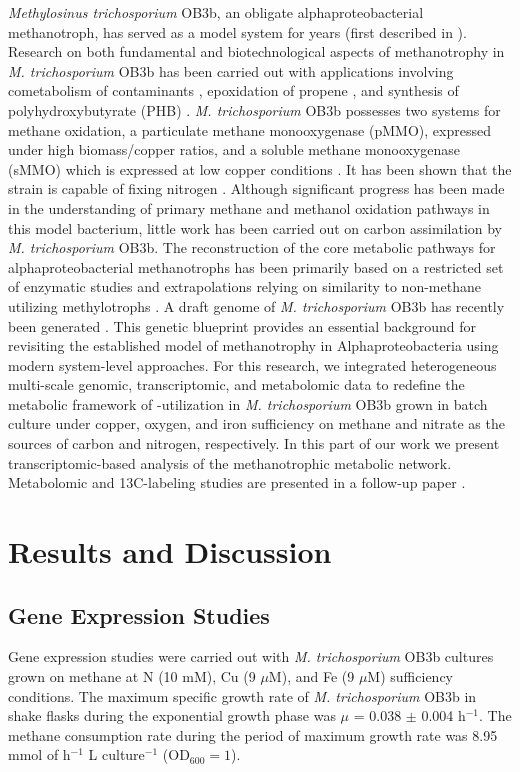 \textit{Methylosinus trichosporium} OB3b, an obligate alphaproteobacterial methanotroph, has served as a model system for years (first described in \cite{whittenbury1970}).
Research on both fundamental and biotechnological aspects of methanotrophy in \textit{M. trichosporium} OB3b has been carried out with applications involving cometabolism of contaminants \cite{oldenhuis1991, EPA1993, fitch1996}, epoxidation of propene \cite{hou1979}, and synthesis of polyhydroxybutyrate (PHB) \cite{williams1998, doronina2008}.
\textit{M. trichosporium} OB3b possesses two systems for methane oxidation, a particulate methane monooxygenase (pMMO), expressed under high biomass/copper ratios, and a soluble methane monooxygenase (sMMO) which is expressed at low copper conditions \cite{hakemian2007, semrau2010}.
It has been shown that the strain is capable of fixing nitrogen \cite{oakley1988, auman2001}.
Although significant progress has been made in the understanding of primary methane and methanol oxidation pathways in this model bacterium, little work has been carried out on carbon assimilation by \textit{M. trichosporium} OB3b.
The reconstruction of the core metabolic pathways for alphaproteobacterial methanotrophs has been primarily based on a restricted set of enzymatic studies and extrapolations relying on similarity to non-methane utilizing methylotrophs \cite{lawrence1970, strom1974}.
A draft genome of \textit{M. trichosporium} OB3b has recently been generated \cite{stein2010}.
This genetic blueprint provides an essential background for revisiting the established model of methanotrophy in Alphaproteobacteria using modern system-level approaches.
For this research, we integrated heterogeneous multi-scale genomic, transcriptomic, and metabolomic data to redefine the metabolic framework of -utilization in \textit{M. trichosporium} OB3b grown in batch culture under copper, oxygen, and iron sufficiency on methane and nitrate as the sources of carbon and nitrogen, respectively.
In this part of our work we present transcriptomic-based analysis of the methanotrophic metabolic network.
Metabolomic and 13C-labeling studies are presented in a follow-up paper \cite{yangOB3b}.

\section{Results and Discussion}

\subsection{Gene Expression Studies}
Gene expression studies were carried out with \textit{M. trichosporium} OB3b cultures grown on methane at N (10 mM), Cu (9 $\mu$M), and Fe (9 $\mu$M) sufficiency conditions.
The maximum specific growth rate of \textit{M. trichosporium} OB3b in shake flasks during the exponential growth phase was $\mu$ = 0.038 $\pm$ 0.004 h$^{-1}$.
The methane consumption rate during the period of maximum growth rate was 8.95 mmol of  h$^{-1}$ L culture$^{-1}$ (OD$_{600} = 1$).

